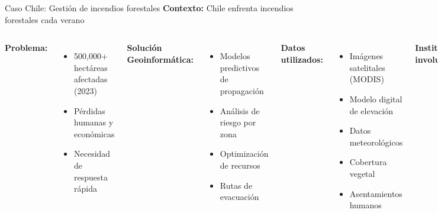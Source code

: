 \documentclass[10pt]{beamer}
\begin{document}
\begin{frame}{Caso Chile: Gestión de incendios forestales}
    \textbf{Contexto:} Chile enfrenta incendios forestales cada verano
    
    \begin{columns}
        \textbf{Problema:}
        \begin{itemize}
            \item 500,000+ hectáreas afectadas (2023)
            \item Pérdidas humanas y económicas
            \item Necesidad de respuesta rápida
        \end{itemize}
        
        \vspace{0.3cm}
        \textbf{Solución Geoinformática:}
        \begin{itemize}
            \item Modelos predictivos de propagación
            \item Análisis de riesgo por zona
            \item Optimización de recursos
            \item Rutas de evacuación
        \end{itemize}
        
        \textbf{Datos utilizados:}
        \begin{itemize}
            \item {} Imágenes satelitales (MODIS)
            \item {} Modelo digital de elevación
            \item {} Datos meteorológicos
            \item {} Cobertura vegetal
            \item {} Asentamientos humanos
        \end{itemize}
        
        \vspace{0.3cm}
        \textbf{Instituciones involucradas:}
        \begin{itemize}
            \item CONAF
            \item SENAPRED
            \item Universidades chilenas
        \end{itemize}
    \end{columns}
\end{frame}
\end{document}
